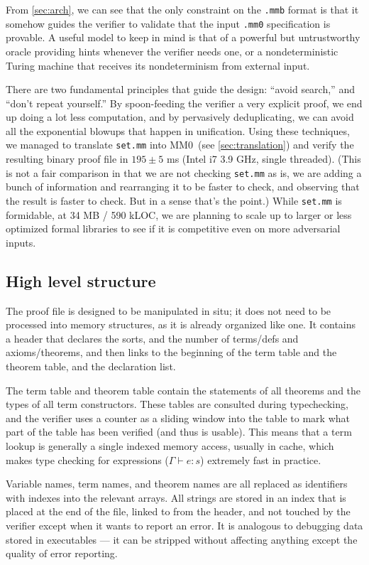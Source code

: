 \documentclass[runningheads]{llncs}
\newcommand{\mmO}{\textsf{MM0}}
\begin{document}
From \autoref{sec:arch}, we can see that the only constraint on the \texttt{.mmb} format is that it somehow guides the verifier to validate that the input \texttt{.mm0} specification is provable. A useful model to keep in mind is that of a powerful but untrustworthy oracle providing hints whenever the verifier needs one, or a nondeterministic Turing machine that receives its nondeterminism from external input.

There are two fundamental principles that guide the design: ``avoid search,'' and ``don't repeat yourself.'' By spoon-feeding the verifier a very explicit proof, we end up doing a lot less computation, and by pervasively deduplicating, we can avoid all the exponential blowups that happen in unification. Using these techniques, we managed to translate \texttt{set.mm} into \mmO\ (see \autoref{sec:translation}) and verify the resulting binary proof file in $195\pm5$ ms (Intel i7 3.9 GHz, single threaded). (This is not a fair comparison in that we are not checking \texttt{set.mm} as is, we are adding a bunch of information and rearranging it to be faster to check, and observing that the result is faster to check. But in a sense that's the point.) While \texttt{set.mm} is formidable, at 34 MB / 590 kLOC, we are planning to scale up to larger or less optimized formal libraries to see if it is competitive even on more adversarial inputs.

\subsection{High level structure}
The proof file is designed to be manipulated in situ; it does not need to be processed into memory structures, as it is already organized like one. It contains a header that declares the sorts, and the number of terms/defs and axioms/theorems, and then links to the beginning of the term table and the theorem table, and the declaration list.

The term table and theorem table contain the statements of all theorems and the types of all term constructors. These tables are consulted during typechecking, and the verifier uses a counter as a sliding window into the table to mark what part of the table has been verified (and thus is usable). This means that a term lookup is generally a single indexed memory access, usually in cache, which makes type checking for expressions ($\Gamma\vdash e:s$) extremely fast in practice.

Variable names, term names, and theorem names are all replaced as identifiers with indexes into the relevant arrays. All strings are stored in an index that is placed at the end of the file, linked to from the header, and not touched by the verifier except when it wants to report an error. It is analogous to debugging data stored in executables --- it can be stripped without affecting anything except the quality of error reporting.
\end{document}
